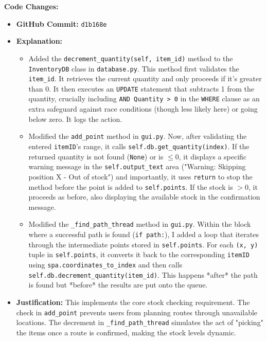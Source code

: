 \textbf{Code Changes:}
\begin{itemize}
	\item \textbf{GitHub Commit:} \verb|d1b168e|
	\item \textbf{Explanation:}
	\begin{itemize}
		\item Added the \verb|decrement_quantity(self, item_id)| method to the \verb|InventoryDB| class in \verb|database.py|. This method first validates the \verb|item_id|. It retrieves the current quantity and only proceeds if it's greater than 0. It then executes an \verb|UPDATE| statement that subtracts 1 from the quantity, crucially including \verb|AND Quantity > 0| in the \verb|WHERE| clause as an extra safeguard against race conditions (though less likely here) or going below zero. It logs the action.
		\item Modified the \verb|add_point| method in \verb|gui.py|. Now, after validating the entered \verb|itemID|'s range, it calls \verb|self.db.get_quantity(index)|. If the returned quantity is not found (\verb|None|) or is $\le 0$, it displays a specific warning message in the \verb|self.output_text| area ("Warning: Skipping position X - Out of stock") and importantly, it uses \verb|return| to stop the method before the point is added to \verb|self.points|. If the stock is $>0$, it proceeds as before, also displaying the available stock in the confirmation message.
		\item Modified the \verb|_find_path_thread| method in \verb|gui.py|. Within the block where a successful path is found (\verb|if path:|), I added a loop that iterates through the intermediate points stored in \verb|self.points|. For each \verb|(x, y)| tuple in \verb|self.points|, it converts it back to the corresponding \verb|itemID| using \verb|spa.coordinates_to_index| and then calls \verb|self.db.decrement_quantity(item_id)|. This happens *after* the path is found but *before* the results are put onto the queue.
	\end{itemize}
	\item \textbf{Justification:} This implements the core stock checking requirement. The check in \verb|add_point| prevents users from planning routes through unavailable locations. The decrement in \verb|_find_path_thread| simulates the act of "picking" the items once a route is confirmed, making the stock levels dynamic.
\end{itemize}

